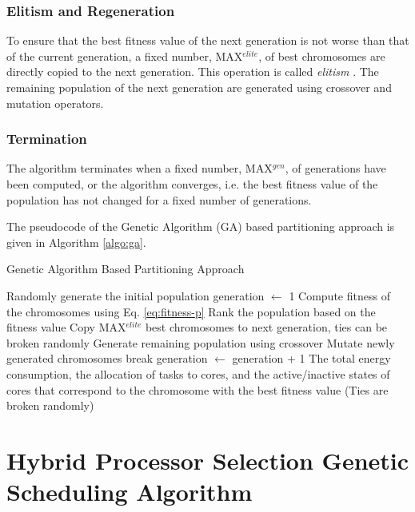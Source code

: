 \documentclass[conference]{IEEEtran}
\begin{document}
\subsubsection{Elitism and Regeneration} To ensure that the best fitness value of the next generation is not worse than that of the current generation, 
a fixed number, MAX$^{elite}$, of best chromosomes are directly copied to the next generation. This operation is called \emph{elitism} \cite{Goldberg}.
The remaining population of the next generation are generated using crossover and mutation operators.


\subsubsection{Termination} The algorithm terminates when a fixed number, MAX$^{gen}$, of generations 
have been computed, or the algorithm converges, i.e. the best fitness value of the population has not changed for a fixed number
of generations.  

The pseudocode of the Genetic Algorithm (GA) based partitioning approach is given in Algorithm \ref{algo:ga}.

\begin{algorithm} 
\caption{Genetic Algorithm Based Partitioning Approach} \label{algo:ga}
\footnotesize
\begin{algorithmic}[1] 
\STATE Randomly generate the initial population 
\STATE generation $\leftarrow$ 1
\STATE Compute fitness of the chromosomes using Eq. \ref{eq:fitness-p}
\STATE Rank the population based on the fitness value
\STATE Copy MAX$^{elite}$ best chromosomes to next generation, ties can be broken randomly
\STATE Generate remaining population using crossover
\STATE Mutate newly generated chromosomes 
\STATE break
\ENDIF
\STATE generation  $\leftarrow$ generation  + 1
\ENDWHILE
\PRINT The total energy consumption, the allocation of tasks to cores, and the active/inactive states of cores that
correspond to the chromosome with the best fitness value (Ties are broken randomly)
\end{algorithmic}
\end{algorithm}

\vspace{-0.1in}



\section{Hybrid Processor Selection Genetic Scheduling Algorithm} %
\end{document}
